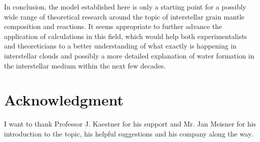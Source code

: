 \documentclass[8.5pt,twoside,twocolumn]{article}
\theoremstyle{standard}
\begin{document}
In conclusion, the model established here is only a starting point for a
possibly wide range of theoretical research around the topic of interstellar
grain mantle composition and reactions. It seems appropriate to further advance
the application of  calculations in this field, which would help
both experimentalists and theoreticians to a better understanding of what
exactly is happening in interstellar clouds and possibly a more detailed
explanation of water formation in the interstellar medium within the next few
decades.

\section*{Acknowledgment}
I want to thank Professor J. Kaestner for his support and Mr. Jan Meisner for
his introduction to the topic, his helpful suggestions and his company along the
way.


% 

%
%

%
{}
\end{document}
